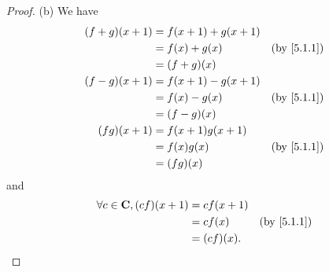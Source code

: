 \begin{proof}{(b)}
  We have
  \begin{align*}
    (f + g)(x + 1) & = f(x + 1) + g(x + 1)                            \\
                   & = f(x) + g(x)         & \text{(by \cref{5.1.1})} \\
                   & = (f + g)(x)                                     \\
    (f - g)(x + 1) & = f(x + 1) - g(x + 1)                            \\
                   & = f(x) - g(x)         & \text{(by \cref{5.1.1})} \\
                   & = (f - g)(x)                                     \\
    (f g)(x + 1)   & = f(x + 1) g(x + 1)                              \\
                   & = f(x) g(x)           & \text{(by \cref{5.1.1})} \\
                   & = (f g)(x)
  \end{align*}
  and
  \begin{align*}
    \forall c \in \C, (c f)(x + 1) & = c f(x + 1)                            \\
                                   & = c f(x)     & \text{(by \cref{5.1.1})} \\
                                   & = (c f)(x).
  \end{align*}
\end{proof}

